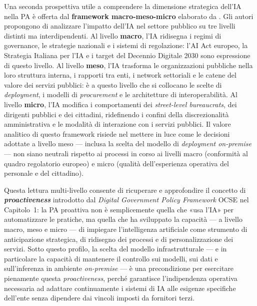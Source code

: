 Una seconda prospettiva utile a comprendere la dimensione strategica dell'IA nella PA è offerta dal \textbf{framework macro-meso-micro} elaborato da \textcite{ValleCruzMacroMesoMicro2024}. Gli autori propongono di analizzare l'impatto dell'IA nel settore pubblico su tre livelli distinti ma interdipendenti. Al livello \textbf{macro}, l'IA ridisegna i regimi di governance, le strategie nazionali e i sistemi di regolazione: l'AI Act europeo, la Strategia Italiana per l'IA e i target del Decennio Digitale 2030 sono espressione di questo livello. Al livello \textbf{meso}, l'IA trasforma le organizzazioni pubbliche nella loro struttura interna, i rapporti tra enti, i network settoriali e le catene del valore dei servizi pubblici: è a questo livello che si collocano le scelte di \textit{deployment}, i modelli di \textit{procurement} e le architetture di interoperabilità. Al livello \textbf{micro}, l'IA modifica i comportamenti dei \textit{street-level bureaucrats}, dei dirigenti pubblici e dei cittadini, ridefinendo i confini della discrezionalità amministrativa e le modalità di interazione con i servizi pubblici. Il valore analitico di questo framework risiede nel mettere in luce come le decisioni adottate a livello meso — inclusa la scelta del modello di \textit{deployment on-premise} — non siano neutrali rispetto ai processi in corso ai livelli macro (conformità al quadro regolatorio europeo) e micro (qualità dell'esperienza operativa del personale e del cittadino).

Questa lettura multi-livello consente di ricuperare e approfondire il concetto di \textbf{\textit{proactiveness}} introdotto dal \textit{Digital Government Policy Framework} OCSE nel Capitolo~1: la PA proattiva non è semplicemente quella che «usa l'IA» per automatizzare le pratiche, ma quella che ha sviluppato la capacità — a livello macro, meso e micro — di impiegare l'intelligenza artificiale come strumento di anticipazione strategica, di ridisegno dei processi e di personalizzazione dei servizi. Sotto questo profilo, la scelta del modello infrastrutturale — e in particolare la capacità di mantenere il controllo sui modelli, sui dati e sull'inferenza in ambiente \textit{on-premise} — è una precondizione per esercitare pienamente questa \textit{proactiveness}, perché garantisce l'indipendenza operativa necessaria ad adattare continuamente i sistemi di IA alle esigenze specifiche dell'ente senza dipendere dai vincoli imposti da fornitori terzi.



